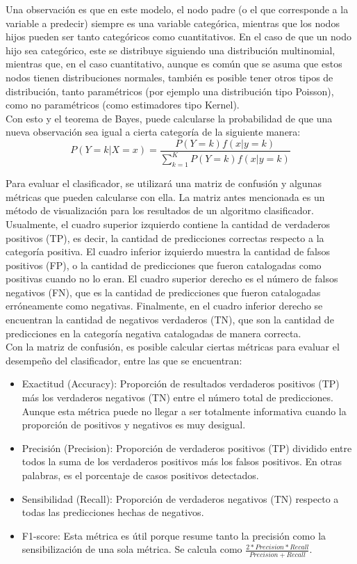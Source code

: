 \documentclass[12pt, letterpaper]{report}
\begin{document}
Una observación es que en este modelo, el nodo padre (o el que corresponde a la variable a predecir) siempre es una variable categórica, mientras que los nodos hijos pueden ser tanto categóricos como cuantitativos. En el caso de que un nodo hijo sea categórico, este se distribuye siguiendo una distribución multinomial, mientras que, en el caso cuantitativo, aunque es común que se asuma que estos nodos tienen distribuciones normales, también es posible tener otros tipos de distribución, tanto paramétricos (por ejemplo una distribución tipo Poisson), como no paramétricos (como estimadores tipo Kernel).
\\

Con esto y el teorema de Bayes, puede calcularse la probabilidad de que una nueva observación sea igual a cierta categoría de la siguiente manera:
\begin{equation*}
    P(Y=k|X=x)=\frac{P(Y=k)f(x|y=k)}
    {\sum_{k=1}^K P(Y=k)f(x|y=k)}
\end{equation*}

Para evaluar el clasificador, se utilizará una matriz de confusión y algunas métricas que pueden calcularse con ella. La matriz antes mencionada es un método de visualización para los resultados de un algoritmo clasificador. Usualmente, el cuadro superior izquierdo contiene la cantidad de verdaderos positivos (TP), es decir, la cantidad de predicciones correctas respecto a la categoría positiva. El cuadro inferior izquierdo muestra la cantidad de falsos positivos (FP), o la cantidad de predicciones que fueron catalogadas como positivas cuando no lo eran. El cuadro superior derecho es el número de falsos negativos (FN), que es la cantidad de predicciones que fueron catalogadas erróneamente como negativas. Finalmente, en el cuadro inferior derecho se encuentran la cantidad de negativos verdaderos (TN), que son la cantidad de predicciones en la categoría negativa catalogadas de manera correcta. \\

Con la matriz de confusión, es posible calcular ciertas métricas para evaluar el desempeño del clasificador, entre las que se encuentran:
\begin{itemize}
    \item Exactitud (Accuracy): Proporción de resultados verdaderos positivos (TP) más los verdaderos negativos (TN) entre el número total de predicciones. Aunque esta métrica puede no llegar a ser totalmente informativa cuando la proporción de positivos y negativos es muy desigual.
    \item Precisión (Precision): Proporción de verdaderos positivos (TP) dividido entre todos la suma de los verdaderos positivos más los falsos positivos. En otras palabras, es el porcentaje de casos positivos detectados.
    \item Sensibilidad (Recall): Proporción de verdaderos negativos (TN) respecto a todas las predicciones hechas de negativos.
    \item F1-score: Esta métrica es útil porque resume tanto la precisión como la sensibilización de una sola métrica. Se calcula como $\frac{2*Precision*Recall}{Precision+Recall}$.
\end{itemize}
\end{document}
